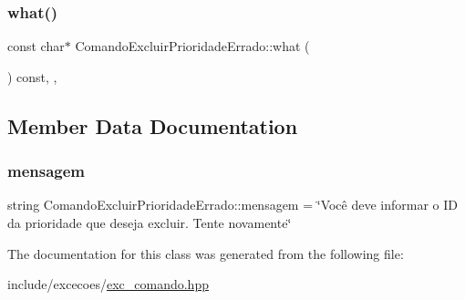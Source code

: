 \subsubsection{\texorpdfstring{what()}{what()}}
{\footnotesize\ttfamily const char$\ast$ Comando\+Excluir\+Prioridade\+Errado\+::what (\begin{DoxyParamCaption}{ }\end{DoxyParamCaption}) const\hspace{0.3cm}{\ttfamily [inline]}, {\ttfamily [override]}, {\ttfamily [noexcept]}}



\subsection{Member Data Documentation}
\mbox{\label{classComandoExcluirPrioridadeErrado_a669931642bcb3157f9cdfc05bedff377}} 
\subsubsection{\texorpdfstring{mensagem}{mensagem}}
{\footnotesize\ttfamily string Comando\+Excluir\+Prioridade\+Errado\+::mensagem = \char`\"{}Você deve informar o ID da prioridade que deseja excluir. Tente novamente\char`\"{}\hspace{0.3cm}{\ttfamily [private]}}



The documentation for this class was generated from the following file\+:\begin{DoxyCompactItemize}
\item 
include/excecoes/\hyperlink{exc__comando_8hpp}{exc\+\_\+comando.\+hpp}\end{DoxyCompactItemize}
